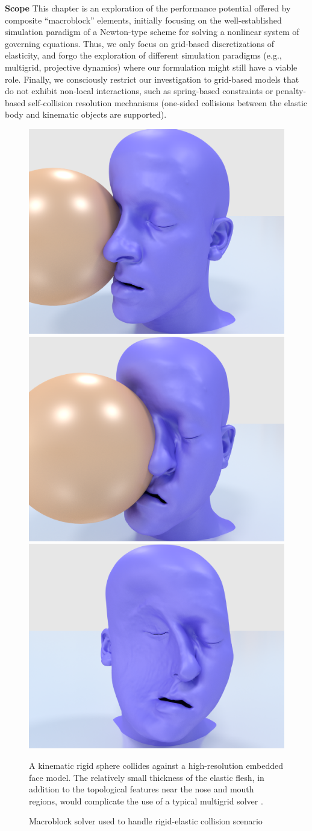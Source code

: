  \textbf{Scope} This chapter is an exploration of the performance
 potential offered by composite ``macroblock'' elements, initially
 focusing on the well-established simulation paradigm of a Newton-type
 scheme for solving a nonlinear system of governing equations. Thus,
 we only focus on grid-based discretizations of elasticity, and forgo
 the exploration of different simulation paradigms (e.g., multigrid,
 projective dynamics) where our formulation might still have a viable
 role.  Finally, we consciously restrict our investigation to
 grid-based models that do not exhibit non-local interactions, such as
 spring-based constraints or penalty-based self-collision resolution
 mechanisms (one-sided collisions between the elastic body and
 kinematic objects are supported).



\begin{figure}
\begin{center}
\includegraphics[width=.32\textwidth]{chapter_macroblocks/images/face_smash1.png}
\includegraphics[width=.32\textwidth]{chapter_macroblocks/images/face_smash2.png}
\includegraphics[width=.32\textwidth]{chapter_macroblocks/images/face_smash3.png} \end{center}
\vspace{-.05in}
\caption{Macroblock solver used to handle rigid-elastic collision
  scenario }{A kinematic rigid sphere collides against a
  high-resolution embedded face model. The relatively small thickness
  of the elastic flesh, in addition to the topological features near
  the nose and mouth regions, would complicate the use of a typical
  multigrid solver \citep{McAdaZSETTS:2011} .}
\vspace{-.15in} \label{fig:macroblocks:face-smash-example}
 \end{figure}

